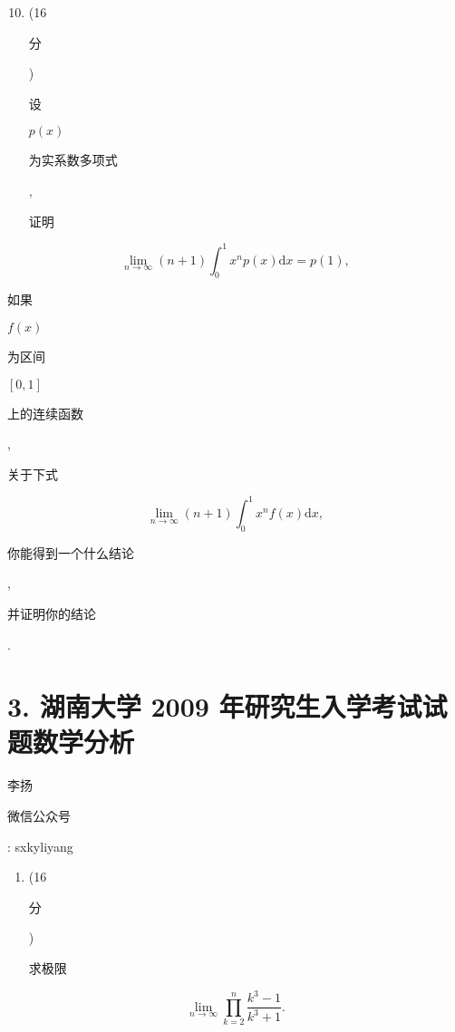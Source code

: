 \documentclass[10pt]{article}
\begin{document}
\begin{enumerate}
  \setcounter{enumi}{9}
  \item (16 \begin{CJK}{UTF8}{mj}分\end{CJK}) \begin{CJK}{UTF8}{mj}设\end{CJK} $p(x)$ \begin{CJK}{UTF8}{mj}为实系数多项式\end{CJK}, \begin{CJK}{UTF8}{mj}证明\end{CJK}
\end{enumerate}
$$
\lim _{n \rightarrow \infty}(n+1) \int_{0}^{1} x^{n} p(x) \mathrm{d} x=p(1),
$$
\begin{CJK}{UTF8}{mj}如果\end{CJK} $f(x)$ \begin{CJK}{UTF8}{mj}为区间\end{CJK} $[0,1]$ \begin{CJK}{UTF8}{mj}上的连续函数\end{CJK}, \begin{CJK}{UTF8}{mj}关于下式\end{CJK}
$$
\lim _{n \rightarrow \infty}(n+1) \int_{0}^{1} x^{n} f(x) \mathrm{d} x,
$$
\begin{CJK}{UTF8}{mj}你能得到一个什么结论\end{CJK}, \begin{CJK}{UTF8}{mj}并证明你的结论\end{CJK}.

\section{3. 湖南大学 2009 年研究生入学考试试题数学分析}
\begin{CJK}{UTF8}{mj}李扬\end{CJK}

\begin{CJK}{UTF8}{mj}微信公众号\end{CJK}: sxkyliyang

\begin{enumerate}
  \item (16 \begin{CJK}{UTF8}{mj}分\end{CJK}) \begin{CJK}{UTF8}{mj}求极限\end{CJK}
\end{enumerate}
$$
\lim _{n \rightarrow \infty} \prod_{k=2}^{n} \frac{k^{3}-1}{k^{3}+1} .
$$
\end{document}

